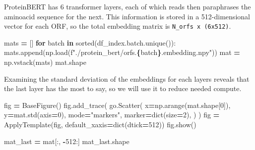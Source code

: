 \documentclass[
]{book}
\newenvironment{Shaded}{\begin{snugshade}}{\end{snugshade}}
\newcommand{\BuiltInTok}[1]{#1}
\newcommand{\ControlFlowTok}[1]{\textcolor[rgb]{0.13,0.29,0.53}{\textbf{#1}}}
\newcommand{\DecValTok}[1]{\textcolor[rgb]{0.00,0.00,0.81}{#1}}
\newcommand{\KeywordTok}[1]{\textcolor[rgb]{0.13,0.29,0.53}{\textbf{#1}}}
\newcommand{\NormalTok}[1]{#1}
\newcommand{\OperatorTok}[1]{\textcolor[rgb]{0.81,0.36,0.00}{\textbf{#1}}}
\newcommand{\SpecialCharTok}[1]{\textcolor[rgb]{0.81,0.36,0.00}{\textbf{#1}}}
\newcommand{\SpecialStringTok}[1]{\textcolor[rgb]{0.31,0.60,0.02}{#1}}
\newcommand{\StringTok}[1]{\textcolor[rgb]{0.31,0.60,0.02}{#1}}
\begin{document}
ProteinBERT has 6 transformer layers, each of which reads then paraphrases the aminoacid sequence for the next.
This information is stored in a 512-dimensional vector for each ORF, so the total embedding matrix is
\texttt{N\_orfs\ x\ (6x512)}.

\begin{Shaded}
\begin{Highlighting}[numbers=left,,]
\NormalTok{mats }\OperatorTok{=}\NormalTok{ []}
\ControlFlowTok{for}\NormalTok{ batch }\KeywordTok{in} \BuiltInTok{sorted}\NormalTok{(df\_index.batch.unique()):}
\NormalTok{    mats.append(np.load(}\SpecialStringTok{f"./protein\_bert/orfs.}\SpecialCharTok{\{}\NormalTok{batch}\SpecialCharTok{\}}\SpecialStringTok{.embedding.npy"}\NormalTok{))}
\NormalTok{mat }\OperatorTok{=}\NormalTok{ np.vstack(mats)}
\NormalTok{mat.shape}
\end{Highlighting}
\end{Shaded}

Examining the standard deviation of the embeddings for each layers reveals that the last layer has the most to say,
so we will use it to reduce needed compute.

\begin{Shaded}
\begin{Highlighting}[numbers=left,,]
\NormalTok{fig }\OperatorTok{=}\NormalTok{ BaseFigure()}
\NormalTok{fig.add\_trace(}
\NormalTok{    go.Scatter(}
\NormalTok{        x}\OperatorTok{=}\NormalTok{np.arange(mat.shape[}\DecValTok{0}\NormalTok{]),}
\NormalTok{        y}\OperatorTok{=}\NormalTok{mat.std(axis}\OperatorTok{=}\DecValTok{0}\NormalTok{),}
\NormalTok{        mode}\OperatorTok{=}\StringTok{"markers"}\NormalTok{,}
\NormalTok{        marker}\OperatorTok{=}\BuiltInTok{dict}\NormalTok{(size}\OperatorTok{=}\DecValTok{2}\NormalTok{),}
\NormalTok{    )}
\NormalTok{)}
\NormalTok{fig }\OperatorTok{=}\NormalTok{ ApplyTemplate(fig, default\_xaxis}\OperatorTok{=}\BuiltInTok{dict}\NormalTok{(dtick}\OperatorTok{=}\DecValTok{512}\NormalTok{))}
\NormalTok{fig.show()}
\end{Highlighting}
\end{Shaded}

\begin{Shaded}
\begin{Highlighting}[numbers=left,,]
\NormalTok{mat\_last }\OperatorTok{=}\NormalTok{ mat[:, }\OperatorTok{{-}}\DecValTok{512}\NormalTok{:]}
\NormalTok{mat\_last.shape}
\end{Highlighting}
\end{Shaded}
\end{document}

